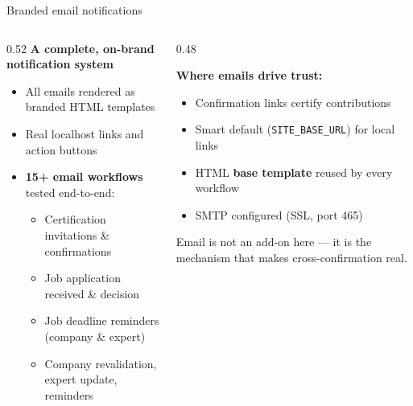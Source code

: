 \documentclass[aspectratio=169, 10pt]{beamer}
\newcommand{\keypoint}[1]{%
  \begin{tcolorbox}[enhanced, colback=utlight, colframe=utteal,
    boxrule=0pt, leftrule=3pt, arc=2pt, boxsep=4pt, left=6pt, right=6pt, top=4pt, bottom=4pt]
    \color{utnavy}#1
  \end{tcolorbox}%
}
\begin{document}
\begin{frame}{Branded email notifications}
  \begin{columns}[T]
    \begin{column}{0.52\textwidth}
      \textbf{A complete, on-brand notification system}
      \begin{itemize}
        \item All emails rendered as branded HTML templates
        \item Real localhost links and action buttons
        \item \textbf{15+ email workflows} tested end-to-end:
          \begin{itemize}\scriptsize
            \item Certification invitations \& confirmations
            \item Job application received \& decision
            \item Job deadline reminders (company \& expert)
            \item Company revalidation, expert update, reminders
          \end{itemize}
      \end{itemize}
    \end{column}
    \begin{column}{0.48\textwidth}
      \begin{tcolorbox}[enhanced, colback=utlight, colframe=utteal, boxrule=0pt, leftrule=3pt, arc=2pt, boxsep=8pt]
        {\color{utnavy}\textbf{Where emails drive trust:}}\\[2pt]
        \begin{itemize}\small
          \item Confirmation links certify contributions
          \item Smart default (\texttt{SITE\_BASE\_URL}) for local links
          \item HTML \textbf{base template} reused by every workflow
          \item SMTP configured (SSL, port 465)
        \end{itemize}
      \end{tcolorbox}
      \vspace{4pt}
      \keypoint{\small Email is not an add-on here --- it is the mechanism that makes cross-confirmation real.}
    \end{column}
  \end{columns}
\end{frame}
\end{document}
